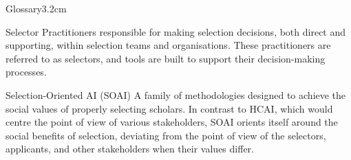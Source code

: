 \begin{mclistof}{Glossary}{3.2cm}
    \item[Selector] Practitioners responsible for making selection decisions, both direct and supporting, within selection teams and organisations. These practitioners are referred to as selectors, and tools are built to support their decision-making processes.

    \item[Selection-Oriented AI (SOAI)] A family of methodologies designed to achieve the social values of properly selecting scholars. In contrast to HCAI, which would centre the point of view of various stakeholders, SOAI orients itself around the social benefits of selection, deviating from the point of view of the selectors, applicants, and other stakeholders when their values differ.
\end{mclistof}